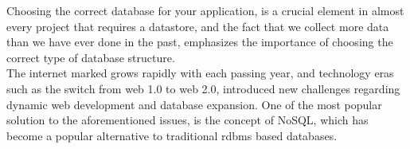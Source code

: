 Choosing the correct database for your application, is a crucial element in almost every project that requires a datastore, and the fact that we collect more data than we have ever done in the past, emphasizes the importance of choosing the correct type of database structure.\\

The internet marked grows rapidly with each passing year, and technology eras such as the switch from web 1.0 to web 2.0, introduced new challenges regarding dynamic web development and database expansion. One of the most popular solution to the aforementioned issues, is the concept of NoSQL, which has become a popular alternative to traditional rdbms based databases.\\